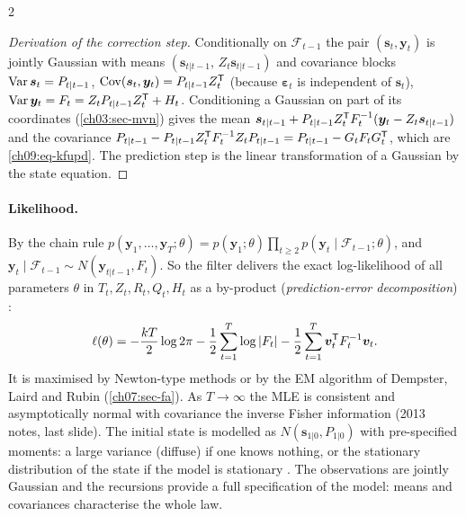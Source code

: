 \begin{paracol}{2}
\begin{proof}[Derivation of the correction step]
Conditionally on $\mathcal F_{t-1}$ the pair $(\bm s_t,\bm y_t)$ is jointly Gaussian with means $(\bm s_{t|t-1},\,Z_t\bm s_{t|t-1})$ and covariance blocks
$\operatorname{Var}\bm s_t=P_{t|t-1}$, $\operatorname{Cov}(\bm s_t,\bm y_t)=P_{t|t-1}Z_t^{\mathsf T}$ (because $\bm\varepsilon_t$ is independent of $\bm s_t$), $\operatorname{Var}\bm y_t=F_t=Z_tP_{t|t-1}Z_t^{\mathsf T}+H_t$. Conditioning a Gaussian on part of
its coordinates (\cref{ch03:sec-mvn}) gives the mean $\bm s_{t|t-1}+P_{t|t-1}Z_t^{\mathsf T} F_t^{-1}(\bm y_t-Z_t\bm s_{t|t-1})$ and the covariance
$P_{t|t-1}-P_{t|t-1}Z_t^{\mathsf T} F_t^{-1}Z_tP_{t|t-1}=P_{t|t-1}-G_tF_tG_t^{\mathsf T}$, which are \eqref{ch09:eq-kfupd}. The prediction step is the linear transformation of a Gaussian by the
state equation.
\end{proof}

\paragraph{Likelihood.} By the chain rule $p(\bm y_1,\dots,\bm y_T;\theta)=p(\bm y_1;\theta)\prod_{t\ge2}p(\bm y_t\mid\mathcal F_{t-1};\theta)$, and
$\bm y_t\mid\mathcal F_{t-1}\sim N(\bm y_{t|t-1},F_t)$. So the filter delivers the exact log-likelihood of all parameters $\theta$ in $T_t,Z_t,R_t,Q_t,H_t$ as a by-product
(\emph{prediction-error decomposition}) :
\begin{equation}\label{ch09:eq-kfll}
  \ell(\theta)=-\frac{kT}2\log2\pi-\frac12\sum_{t=1}^T\log|F_t|-\frac12\sum_{t=1}^T\bm v_t^{\mathsf T} F_t^{-1}\bm v_t .
\end{equation}
It is maximised by Newton-type methods or by the EM algorithm of Dempster, Laird and Rubin (\cref{ch07:sec-fa}). As $T\to\infty$ the MLE is consistent and asymptotically normal
with covariance the inverse Fisher information (2013 notes, last slide). The initial state is modelled as $N(\bm s_{1|0},P_{1|0})$ with pre-specified moments: a large variance (diffuse) if one knows nothing, or the
stationary distribution of the state if the model is stationary . The observations are jointly Gaussian and the recursions provide a full specification of the model: means and
covariances characterise the whole law.


\end{paracol}
